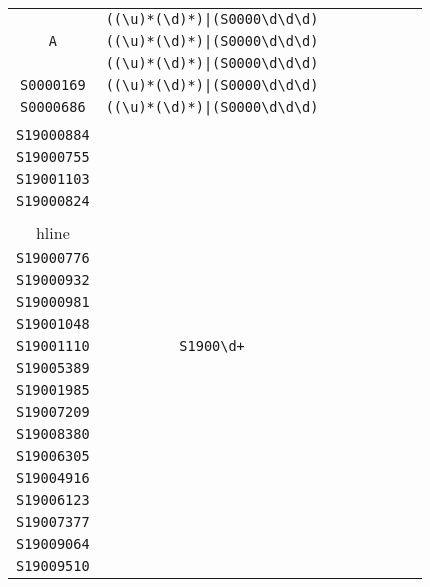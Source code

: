 \begin{longtable}{cccccccc}
\begin{tabular}{ll}
    \verb|| & \verb.((\u)*(\d)*)|(S0000\d\d\d).\\
\verb|A| & \verb.((\u)*(\d)*)|(S0000\d\d\d).\\
\verb|| & \verb.((\u)*(\d)*)|(S0000\d\d\d).\\
\verb|S0000169| & \verb.((\u)*(\d)*)|(S0000\d\d\d).\\
\verb|S0000686| & \verb.((\u)*(\d)*)|(S0000\d\d\d).
\end{tabular}
\\\midrule 
\begin{tabular}{l}
    \verb|S19000768|\\
\verb|S19000884|\\
\verb|S19000755|\\
\verb|S19001103|\\
\verb|S19000824|\\
\\hline\\
\verb|S19000776|\\
\verb|S19000932|\\
\verb|S19000981|\\
\verb|S19001048|\\
\verb|S19001110|
\end{tabular}

&
\verb|S1900\d+|
&

\begin{tabular}{l}
    \verb|S1900\d\d\d\d|\\
\verb|S19005389|\\
\verb|S19001985|\\
\verb|S19007209|\\
\verb|S19008380|\\
\verb|S19006305|
\end{tabular}

&

\begin{tabular}{l}
    \verb|S1900\d\d\d\d|\\
\verb|S19004916|\\
\verb|S19006123|\\
\verb|S19007377|\\
\verb|S19009064|\\
\verb|S19009510|
\end{tabular}

&


\end{longtable}
